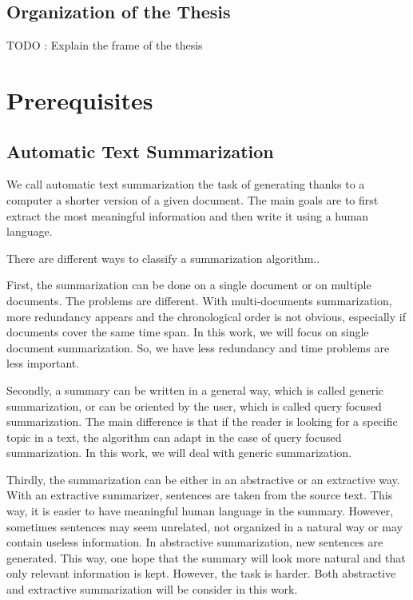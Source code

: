 \documentclass[11pt,a4paper,oldfontcommands]{memoir}
\begin{document}
\section{Organization of the Thesis}

TODO : Explain the frame of the thesis

\chapter{Prerequisites}

\section{Automatic Text Summarization}

We call automatic text summarization the task of generating thanks to a computer a shorter version of a given document. The main goals are to first extract the most meaningful information and then write it using a human language.

There are different ways to classify a summarization algorithm..

First, the summarization can be done on a single document or on multiple documents. The problems are different. With multi-documents summarization, more redundancy appears and the chronological order is not obvious, especially if documents cover the same time span. In this work, we will focus on single document summarization. So, we have less redundancy and time problems are less important.

Secondly, a summary can be written in a general way, which is called generic summarization, or can be oriented by the user, which is called query focused summarization. The main difference is that if the reader is looking for a specific topic in a text, the algorithm can adapt in the case of query focused summarization. In this work, we will deal with generic summarization.

Thirdly, the summarization can be either in an abstractive or an extractive way. With an extractive summarizer, sentences are taken from the source text. This way, it is easier to have meaningful human language in the summary. However, sometimes sentences may seem unrelated, not organized in a natural way or may contain useless information. In abstractive summarization, new sentences are generated. This way, one hope that the summary will look more natural and that only relevant information is kept. However, the task is harder. Both abstractive and extractive summarization will be consider in this work.
\end{document}
